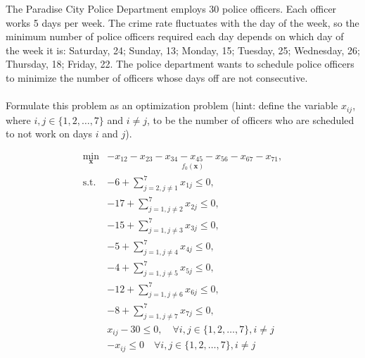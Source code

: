 \begin{homeworkProblem}

    The Paradise City Police Department employs 30 police officers. Each officer 
    works 5 days per week. The crime rate fluctuates with the day of the week, 
    so the minimum number of police officers required each day depends on which 
    day of the week it is: Saturday, 24; Sunday, 13; Monday, 15; Tuesday, 25; 
    Wednesday, 26; Thursday, 18; Friday, 22. The police department wants to 
    schedule police officers to minimize the number of officers whose days off 
    are not consecutive.
    \\ \\
    Formulate this problem as an optimization problem (hint: define the variable 
    $x_{ij}$, where $i, j \in \{1, 2, \ldots, 7\}$ and $i\neq j$, to be the number 
    of officers who are scheduled to not work on days $i$ and $j$).
    \\

    \begin{solution}
        \[
            \begin{array}{rl}
                \min\limits_{\boldsymbol{x}} & \underset{f_0(\boldsymbol{x})}{\boxed{-x_{12} - x_{23} - x_{34} - x_{45} - x_{56} - x_{67} - x_{71}}}, \\ [3ex]
                \text{s.t.} &  - 6 + \sum_{j=2, j \neq 1}^{7} x_{1j} \leq 0, \\ [3ex]
                            & -17 + \sum_{j=1, j \neq 2}^{7} x_{2j} \leq 0, \\ [3ex]
                            & - 15 + \sum_{j=1, j \neq 3}^{7} x_{3j} \leq 0, \\ [3ex]
                            & -5 + \sum_{j=1, j \neq 4}^{7} x_{4j} \leq 0, \\ [3ex]
                            & -4 + \sum_{j=1, j \neq 5}^{7} x_{5j} \leq 0, \\ [3ex]
                            & -12 + \sum_{j=1, j \neq 6}^{7} x_{6j} \leq 0, \\ [3ex]
                            & -8 + \sum_{j=1, j \neq 7}^{7} x_{7j} \leq 0, \\ [3ex]
                            & x_{ij} - 30 \leq 0, \quad \forall i,j \in \{1, 2, \ldots, 7\}, i \neq j \\ [3ex]
                            & - x_{ij} \leq 0 \quad \forall i,j \in \{1, 2, \ldots, 7\}, i \neq j


\end{array}\]
\end{solution}
\end{homeworkProblem}

